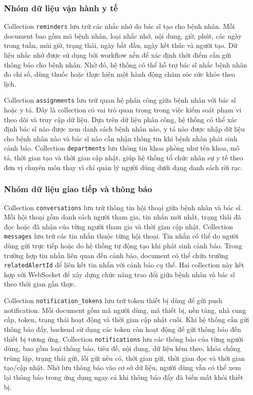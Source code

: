 \subsubsection{Nhóm dữ liệu vận hành y tế}

\par Collection \texttt{reminders} lưu trữ các nhắc nhở do bác sĩ tạo cho bệnh nhân. Mỗi document bao gồm mã bệnh nhân, loại nhắc nhở, nội dung, giờ, phút, các ngày trong tuần, múi giờ, trạng thái, ngày bắt đầu, ngày kết thúc và người tạo. Dữ liệu nhắc nhở được sử dụng bởi workflow nền để xác định thời điểm cần gửi thông báo cho bệnh nhân. Nhờ đó, hệ thống có thể hỗ trợ bác sĩ nhắc bệnh nhân đo chỉ số, dùng thuốc hoặc thực hiện một hành động chăm sóc sức khỏe theo lịch.

\par Collection \texttt{assignments} lưu trữ quan hệ phân công giữa bệnh nhân với bác sĩ hoặc y tá. Đây là collection có vai trò quan trọng trong việc kiểm soát phạm vi theo dõi và truy cập dữ liệu. Dựa trên dữ liệu phân công, hệ thống có thể xác định bác sĩ nào được xem danh sách bệnh nhân nào, y tá nào được nhập dữ liệu cho bệnh nhân nào và bác sĩ nào cần nhận thông tin khi bệnh nhân phát sinh cảnh báo. Collection \texttt{departments} lưu thông tin khoa phòng như tên khoa, mô tả, thời gian tạo và thời gian cập nhật, giúp hệ thống tổ chức nhân sự y tế theo đơn vị chuyên môn thay vì chỉ quản lý người dùng dưới dạng danh sách rời rạc.

\subsubsection{Nhóm dữ liệu giao tiếp và thông báo}

\par Collection \texttt{conversations} lưu trữ thông tin hội thoại giữa bệnh nhân và bác sĩ. Mỗi hội thoại gồm danh sách người tham gia, tin nhắn mới nhất, trạng thái đã đọc hoặc đã nhận của từng người tham gia và thời gian cập nhật. Collection \texttt{messages} lưu trữ các tin nhắn thuộc từng hội thoại. Tin nhắn có thể do người dùng gửi trực tiếp hoặc do hệ thống tự động tạo khi phát sinh cảnh báo. Trong trường hợp tin nhắn liên quan đến cảnh báo, document có thể chứa trường \texttt{relatedAlertId} để liên kết tin nhắn với cảnh báo cụ thể. Hai collection này kết hợp với WebSocket để xây dựng chức năng trao đổi giữa bệnh nhân và bác sĩ theo thời gian gần thực.

\par Collection \texttt{notification\_tokens} lưu trữ token thiết bị dùng để gửi push notification. Mỗi document gồm mã người dùng, mã thiết bị, nền tảng, nhà cung cấp, token, trạng thái hoạt động và thời gian cập nhật cuối. Khi hệ thống cần gửi thông báo đẩy, backend sử dụng các token còn hoạt động để gửi thông báo đến thiết bị tương ứng. Collection \texttt{notifications} lưu các thông báo của từng người dùng, bao gồm loại thông báo, tiêu đề, nội dung, dữ liệu kèm theo, khóa chống trùng lặp, trạng thái gửi, lỗi gửi nếu có, thời gian gửi, thời gian đọc và thời gian tạo/cập nhật. Nhờ lưu thông báo vào cơ sở dữ liệu, người dùng vẫn có thể xem lại thông báo trong ứng dụng ngay cả khi thông báo đẩy đã biến mất khỏi thiết bị.

